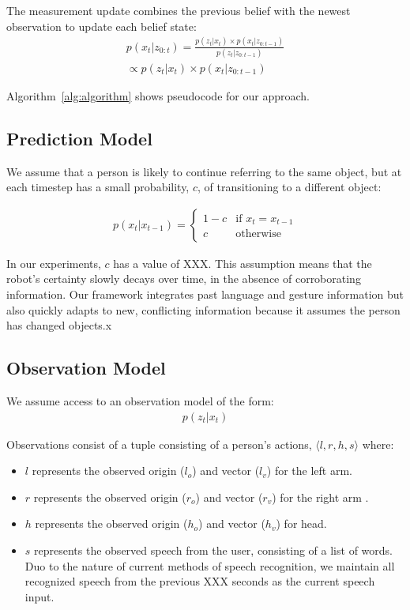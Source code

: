 \documentclass[letterpaper, 10 pt, conference]{ieeeconf}
\newcommand{\stnote}[1]{\textcolor{Blue}{\textbf{ST: #1}}}
\begin{document}
The measurement update combines the previous belief with the newest observation to update each belief state: 
\begin{align}
p(x_t |z_{0:t}) = \frac{p(z_t | x_t) \times p(x_t | z_{0:t-1})}{p(z_t | z_{0:t-1})} \\\propto p(z_t | x_t) \times p(x_t | z_{0:t-1})
\end{align}

Algorithm~\ref{alg:algorithm} shows pseudocode for our approach.


\subsection{Prediction Model}

We assume that a person is likely to continue referring to the same
object, but at each timestep has a small probability, $c$, of
transitioning to a different object: 

\begin{align}
p(x_t | x_{t-1}) = \left\{  \begin{array}{ll}
1-c &\mbox{if } x_t = x_{t-1}\\
c &\mbox{otherwise}
\end{array}\right.
\end{align}

In our experiments, $c$ has a value of XXX.  This assumption means
that the robot's certainty slowly decays over time, in the absence of
corroborating information.  Our framework integrates past language and
gesture information but also quickly adapts to new, conflicting
information because it assumes the person has changed objects.x


\subsection{Observation Model}

We assume access to an observation model of the form:
\begin{align}
p(z_t | x_t)
\end{align}

Observations consist of a tuple consisting of a person's actions,
$\langle l, r, h, s\rangle $ where:
\begin{itemize}
	\item $l$ represents the observed origin ($l_o$) and vector ($l_v$) for the left arm.
	\item $r$ represents the observed origin  ($r_o$) and vector ($r_v$)  for the right arm .
	\item $h$ represents the observed origin  ($h_o$) and vector ($h_v$)  for head.
	\item $s$ represents the observed speech from the user,
          consisting of a list of words. Duo to the nature of current
          methods of speech recognition, we maintain all recognized
          speech from the previous XXX seconds as the current speech
          input.
	\end{itemize}
\end{document}
